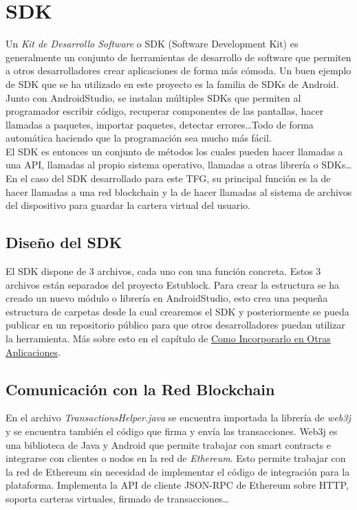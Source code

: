 \section{SDK} \label{sec:SDK}

Un \emph{Kit de Desarrollo Software} o SDK (Software Development Kit) es generalmente un conjunto de herramientas de desarrollo de software que permiten a otros desarrolladores crear aplicaciones de forma más cómoda. Un buen ejemplo de SDK que se ha utilizado en este proyecto es la familia de SDKs de Android. Junto con AndroidStudio, se instalan múltiples SDKs que permiten al programador escribir código, recuperar componentes de las pantallas, hacer llamadas a paquetes, importar paquetes, detectar errores\dots Todo de forma automática haciendo que la programación sea mucho más fácil. \\

El SDK es entonces un conjunto de métodos los cuales pueden hacer llamadas a una API, llamadas al propio sistema operativo, llamadas a otras librería o SDKs\dots En el caso del SDK desarrollado para este TFG, su principal función es la de hacer llamadas a una red blockchain y la de hacer llamadas al sistema de archivos del dispositivo para guardar la cartera virtual del usuario. 

\subsection{Diseño del SDK}

El SDK dispone de 3 archivos, cada uno con una función concreta. Estos 3 archivos están separados del proyecto Estublock. Para crear la estructura se ha creado un nuevo módulo o librería en AndroidStudio, esto crea una pequeña estructura de carpetas desde la cual crearemos el SDK y posteriormente se pueda publicar en un repositorio público para que otros desarrolladores puedan utilizar la herramienta. Más sobre esto en el capítulo de \hyperref[sec:Maven]{Como Incorporarlo en Otras Aplicaciones}. 

\subsection{Comunicación con la Red Blockchain}
En el archivo \emph{TransactionsHelper.java} se encuentra importada la librería de \emph{web3j} y se encuentra también el código que firma y envía las transacciones. Web3j es una biblioteca de Java y Android que permite trabajar con smart contracts e integrarse con clientes o nodos en la red de \emph{Ethereum}. Esto permite trabajar con la red de Ethereum sin necesidad de implementar el código de integración para la plataforma. Implementa la API de cliente JSON-RPC de Ethereum sobre HTTP, soporta carteras virtuales, firmado de transacciones\dots \\


